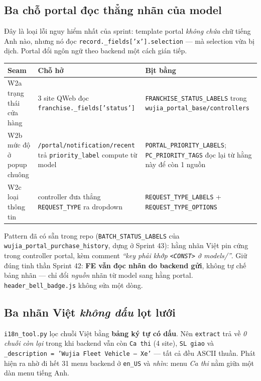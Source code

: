 \subsection{Ba chỗ portal đọc thẳng nhãn của model}

Đây là loại lỗi nguy hiểm nhất của sprint: template portal \emph{không chứa} chữ tiếng Anh nào,
nhưng nó đọc \texttt{record.\_fields['x'].selection} --- mà selection vừa bị dịch. Portal đổi ngôn
ngữ theo backend một cách gián tiếp.

\begin{center}
\begin{tabular}{p{3.4cm}p{4.6cm}p{5.4cm}}
\hline
\textbf{Seam} & \textbf{Chỗ hở} & \textbf{Bịt bằng} \\
\hline
W2a trạng thái cửa hàng & 3 site QWeb đọc
  \texttt{franchise.\_fields['status']} & \texttt{FRANCHISE\_STATUS\_LABELS} trong
  \texttt{wujia\_portal\_base/controllers} \\
W2b mức độ ở popup chuông & \texttt{/portal/notification/recent} trả
  \texttt{priority\_label} compute từ model & \texttt{PORTAL\_PRIORITY\_LABELS}; \texttt{PC\_PRIORITY\_TAGS}
  đọc lại từ hằng này để còn 1 nguồn \\
W2c loại thông tin & controller đưa thẳng \texttt{REQUEST\_TYPE} ra dropdown &
  \texttt{REQUEST\_TYPE\_LABELS} + \texttt{REQUEST\_TYPE\_OPTIONS} \\
\hline
\end{tabular}
\end{center}

Pattern đã có sẵn trong repo (\texttt{BATCH\_STATUS\_LABELS} của
\texttt{wujia\_portal\_purchase\_history}, dựng ở Sprint 43): hằng nhãn Việt pin cứng trong
controller portal, kèm comment \emph{``key phải khớp \texttt{<CONST>} ở models/''}. Giữ đúng tinh
thần Sprint 42: \textbf{FE vẫn đọc nhãn do backend gửi}, không tự chế bảng nhãn --- chỉ đổi
\emph{nguồn} nhãn từ model sang hằng portal. \texttt{header\_bell\_badge.js} không sửa một dòng.

\subsection{Ba nhãn Việt \emph{không dấu} lọt lưới}

\texttt{i18n\_tool.py} lọc chuỗi Việt bằng \textbf{bảng ký tự có dấu}. Nên
\texttt{extract} trả về \emph{0 chuỗi còn lại} trong khi backend vẫn còn \texttt{Ca thi} (4 site),
\texttt{SL giao} và \texttt{\_description = 'Wujia Fleet Vehicle --- Xe'} --- tất cả đều ASCII thuần.
Phát hiện ra nhờ đi hết 31 menu backend ở \texttt{en\_US} và \emph{nhìn}: menu \emph{Ca thi} nằm giữa
một dàn menu tiếng Anh.

